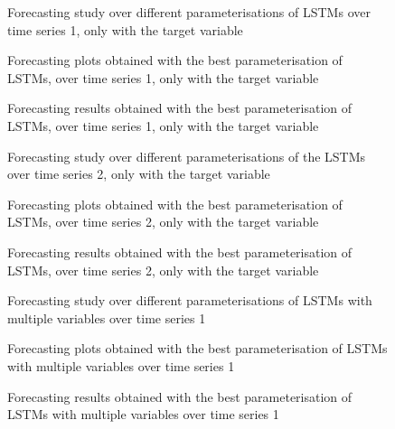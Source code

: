 \documentclass[10pt]{extarticle}
\begin{document}
\begin{figure}[H]
\caption{Forecasting study over different parameterisations of LSTMs over time series 1, only with the target variable}
\end{figure}

\begin{figure}[H]
\caption{Forecasting plots obtained with the best parameterisation of LSTMs, over time series 1, only with the target variable}
\end{figure}

\begin{figure}[H]
\caption{Forecasting results obtained with the best parameterisation of LSTMs, over time series 1, only with the target variable}
\end{figure}

\begin{figure}[H]
\caption{Forecasting study over different parameterisations of the LSTMs over time series 2, only with the target variable}
\end{figure}

\begin{figure}[H]
\caption{Forecasting plots obtained with the best parameterisation of LSTMs, over time series 2, only with the target variable}
\end{figure}

\begin{figure}[H]
\caption{Forecasting results obtained with the best parameterisation of LSTMs, over time series 2, only with the target variable}
\end{figure}

\begin{figure}[H]
\caption{Forecasting study over different parameterisations of LSTMs with multiple variables over time series 1}
\end{figure}

\begin{figure}[H]
\caption{Forecasting plots obtained with the best parameterisation of LSTMs with multiple variables over time series 1}
\end{figure}

\begin{figure}[H]
\caption{Forecasting results obtained with the best parameterisation of LSTMs with multiple variables over time series 1}
\end{figure}
\end{document}
